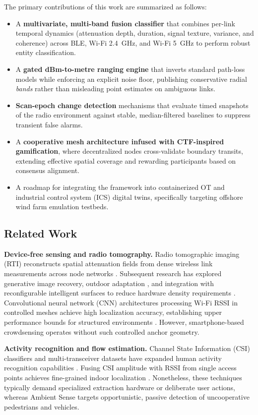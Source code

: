 \documentclass[journal,10pt]{IEEEtran}
\begin{document}
The primary contributions of this work are summarized as follows:
\begin{itemize}
    \item A \textbf{multivariate, multi-band fusion classifier} that combines per-link temporal dynamics (attenuation depth, duration, signal texture, variance, and coherence) across BLE, Wi-Fi 2.4~GHz, and Wi-Fi 5~GHz to perform robust entity classification.
    \item A \textbf{gated dBm-to-metre ranging engine} that inverts standard path-loss models while enforcing an explicit noise floor, publishing conservative radial \emph{bands} rather than misleading point estimates on ambiguous links.
    \item \textbf{Scan-epoch change detection} mechanisms that evaluate timed snapshots of the radio environment against stable, median-filtered baselines to suppress transient false alarms.
    \item A \textbf{cooperative mesh architecture infused with CTF-inspired gamification}, where decentralized nodes cross-validate boundary transits, extending effective spatial coverage and rewarding participants based on consensus alignment.
    \item A roadmap for integrating the framework into containerized OT and industrial control system (ICS) digital twins, specifically targeting offshore wind farm emulation testbeds.
\end{itemize}

\subsection{Related Work}
\textbf{Device-free sensing and radio tomography.} Radio tomographic imaging (RTI) reconstructs spatial attenuation fields from dense wireless link measurements across node networks \cite{wilson2010}. Subsequent research has explored generative image recovery, outdoor adaptation \cite{alippi2016}, and integration with reconfigurable intelligent surfaces to reduce hardware density requirements \cite{li2024}. Convolutional neural network (CNN) architectures processing Wi-Fi RSSI in controlled meshes achieve high localization accuracy, establishing upper performance bounds for structured environments \cite{cnnrti2025}. However, smartphone-based crowdsensing operates without such controlled anchor geometry.

\textbf{Activity recognition and flow estimation.} Channel State Information (CSI) classifiers and multi-transceiver datasets have expanded human activity recognition capabilities \cite{wong2024}. Fusing CSI amplitude with RSSI from single access points achieves fine-grained indoor localization \cite{sanchez2020}. Nonetheless, these techniques typically demand specialized extraction hardware or deliberate user actions, whereas Ambient Sense targets opportunistic, passive detection of uncooperative pedestrians and vehicles.
\end{document}
